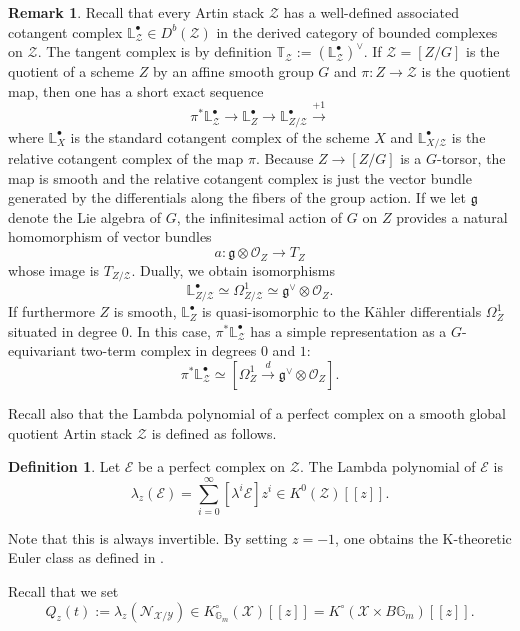 \documentclass[12pt]{amsart}
\newcommand\Gm{\mathbb{G}_m}
\newcommand{\bL}{\mathbb{L}}
\newcommand{\bT}{\mathbb{T}}
\newcommand{\sE}{\mathscr{E}}
\newcommand{\sN}{\mathscr{N}}
\newcommand{\sO}{\mathscr{O}}
\newcommand{\cX}{\mathcal{X}}
\newcommand{\cY}{\mathcal{Y}}
\newcommand{\cZ}{\mathcal{Z}}
\newcommand{\Kring}{K^{\circ}}
\theoremstyle{definition}
\newtheorem{Def}[theorem]{Definition}
\newtheorem{Rmk}[theorem]{Remark}
\begin{document}
\begin{Rmk}\label{rmk: tangent complex stacks}
    Recall that every Artin stack $\cZ$ has a well-defined associated cotangent complex $\bL_{\cZ}^\bullet \in D^b(\cZ)$ in the derived category of bounded complexes on $\cZ$. The tangent complex is by definition $\bT_{\cZ}:=(\bL_{\cZ}^\bullet)^\vee $. If $\cZ=[Z/G]$ is the quotient of a scheme $Z$ by an affine smooth group $G$ and $\pi: Z \to \cZ$ is the quotient map, then one has a short exact sequence 
    $$
        \pi^*\mathbb{L}_{\mathcal{Z}}^\bullet \to \mathbb{L}_Z^\bullet \to \mathbb{L}_{Z/\mathcal{Z}}^\bullet \xrightarrow{+1}
    $$
    where $\mathbb{L}_X^\bullet$ is the standard cotangent complex of the scheme $X$ and $\mathbb{L}_{X/\mathcal{Z}}^\bullet$ is the relative cotangent complex of the map $\pi$.  Because $Z \to [Z/G]$ is a $G$-torsor, the map is smooth and the relative cotangent complex is just the vector bundle generated by the differentials along the fibers of the group action. If we let $\mathfrak{g}$ denote the Lie algebra of $G$, the infinitesimal action of $G$ on $Z$ provides a natural homomorphism of vector bundles
    $$
        a: \mathfrak{g} \otimes \sO_Z \to T_Z
    $$
    whose image is $T_{Z/\cZ}$. Dually, we obtain isomorphisms
    $$
        \mathbb{L}_{Z/\mathcal{Z}}^\bullet \simeq \Omega^1_{Z/\mathcal{Z}} \simeq \mathfrak{g}^\vee \otimes \sO_Z.
    $$
    If furthermore $Z$ is smooth, $\mathbb{L}_Z^\bullet$ is quasi-isomorphic to the Kähler differentials $\Omega_Z^1$ situated in degree $0$. In this case, $\pi^*\mathbb{L}_{\mathcal{Z}}^\bullet$ has a simple representation as a $G$-equivariant two-term complex in degrees $0$ and $1$:
    $$
        \pi^*\mathbb{L}_{\mathcal{Z}}^\bullet \simeq [ \Omega_Z^1 \xrightarrow{d} \mathfrak{g}^\vee \otimes \sO_Z ].
    $$
\end{Rmk}

Recall also that the Lambda polynomial of a perfect complex on a smooth global quotient Artin stack $\cZ$ is defined as follows.

\begin{Def}
    Let $\sE$ be a perfect complex on $\cZ$. The Lambda polynomial of $\sE$ is
    $$
        \lambda_z(\sE) = \sum_{i = 0}^\infty [\lambda^i \sE] z^i \in K^0(\mathcal{Z})[\![ z ]\!].
    $$    
\end{Def}

Note that this is always invertible. By setting $z = -1$, one obtains the K-theoretic Euler class as defined in .

Recall that we set 
$$Q_z(t) := \lambda_z(\sN_{\cX/\cY}) \in \Kring_{\mathbb{G}_m}(\cX)[\![ z ]\!]= \Kring(\cX \times B\Gm)[\![ z ]\!].$$
\end{document}
